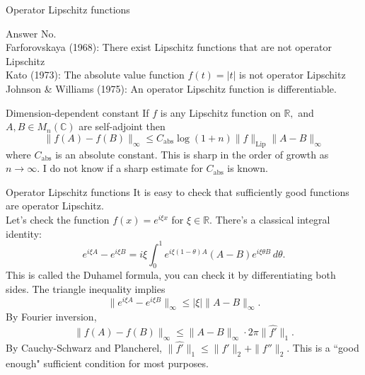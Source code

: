 \documentclass{beamer}
\numberwithin{equation}{section}
\theoremstyle{plain}
\theoremstyle{plain}
\theoremstyle{definition}
\theoremstyle{plain}
\theoremstyle{plain}
\theoremstyle{definition}
\newcommand{\Rl}{\mathbb{R}}
\newcommand{\Cplx}{\mathbb{C}}
\begin{document}
\begin{frame}{Operator Lipschitz functions}
    \begin{block}{Answer}
        No.\\\pause
        Farforovskaya (1968): There exist Lipschitz functions that are not operator Lipschitz\\\pause
        Kato (1973): The absolute value function $f(t) = |t|$ is not operator Lipschitz\\\pause
        Johnson \& Williams (1975): An operator Lipschitz function is differentiable.
    \end{block}
\end{frame}

\begin{frame}{Dimension-dependent constant}
    If $f$ is any Lipschitz function on $\Rl,$ and $A,B \in M_n(\Cplx)$ are self-adjoint then
    \[
        \|f(A)-f(B)\|_{\infty} \leq C_{\mathrm{abs}}\log(1+n)\|f\|_{\mathrm{Lip}}\|A-B\|_{\infty}
    \]
    where $C_{\mathrm{abs}}$ is an absolute constant. This is sharp in the order of growth as $n\to\infty.$ I do not know if a sharp estimate for $C_{\mathrm{abs}}$ is known.
\end{frame}


\begin{frame}{Operator Lipschitz functions}
    It is easy to check that sufficiently good functions are operator Lipschitz.\\
    Let's check the function $f(x) = e^{i\xi x}$ for $\xi\in \Rl.$ There's a classical integral identity:
    \begin{equation*}
        e^{i\xi A}-e^{i\xi B} = i\xi\int_{0}^1 e^{i\xi (1-\theta)A}(A-B)e^{i\xi \theta B}\,d\theta.
    \end{equation*}
    This is called the Duhamel formula, you can check it by differentiating both sides. The triangle inequality implies
    $$
        \|e^{i\xi A}-e^{i\xi B}\|_{\infty} \leq |\xi|\|A-B\|_{\infty}.
    $$
    \pause
    By Fourier inversion,
    \begin{equation*}
        \|f(A)-f(B)\|_{\infty} \leq \|A-B\|_\infty\cdot 2\pi \|\widehat{f'}\|_1.
    \end{equation*}
    \pause
    By Cauchy-Schwarz and Plancherel, $\|\widehat{f'}\|_1 \leq \|f'\|_2+\|f''\|_2.$ This is a ``good enough" sufficient condition for most purposes.
\end{frame}
\end{document}
